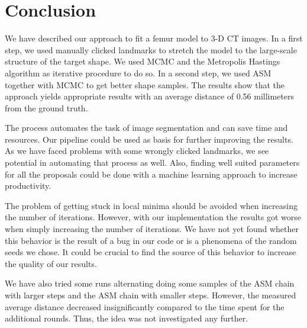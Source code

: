 \section{Conclusion}
\label{sec:conclusion}

We have described our approach to fit a femur model to 3-D CT images.
In a first step, we used manually clicked landmarks to stretch the model to the large-scale structure of the target shape.
We used MCMC and the Metropolis Hastings algorithm as iterative procedure to do so.
In a second step, we used ASM together with MCMC to get better shape samples.
The results show that the approach yields appropriate results with an average distance of 0.56 millimeters from the ground truth.

The process automates the task of image segmentation and can save time and resources.
Our pipeline could be used as basis for further improving the results.
As we have faced problems with some wrongly clicked landmarks, we see potential in automating that process as well.
Also, finding well suited parameters for all the proposals could be done with a machine learning approach to increase productivity.

The problem of getting stuck in local minima should be avoided when increasing the number of iterations.
However, with our implementation the results got worse when simply increasing the number of iterations.
We have not yet found whether this behavior is the result of a bug in our code or is a phenomena of the random seeds we chose.
It could be crucial to find the source of this behavior to increase the quality of our results.

We have also tried some runs alternating doing some samples of the ASM chain with larger steps and the ASM chain with smaller steps.
However, the measured average distance decreased insignificantly compared to the time spent for the additional rounds.
Thus, the idea was not investigated any further.

